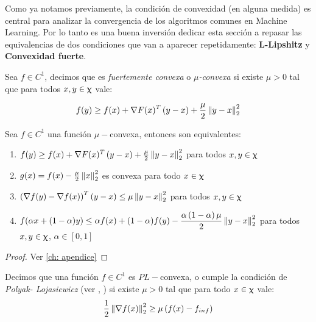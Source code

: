 Como ya notamos previamente, la condici\'on de convexidad (en alguna medida) es central para analizar la convergencia de los algoritmos comunes en Machine Learning. Por lo tanto es una buena inversi\'on dedicar esta secci\'on a repasar las equivalencias de dos condiciones que van a aparecer repetidamente: \textbf{L-Lipshitz} y \textbf{Convexidad fuerte}.

\begin{definition}
	\label{def: Fuertemente convexa}
	Sea $f \in C^1$, decimos que es \textit{fuertemente convexa} o $\mu$\textit{-convexa} si existe $\mu > 0$ tal que para todos $x,y \in \upchi$ vale:
	
	\begin{equation}
		f(y) \geq f(x) + \nabla F(x)^T\left(y-x\right) + \frac{\mu}{2} \left\lVert y-x\right\rVert_2^2
	\end{equation}
\end{definition}

\begin{proposition}
	\label{prop: equivalencias convexidad fuerte}
	Sea $f \in C^1$ una funci\'on $\mu-$convexa, entonces son equivalentes:
	\begin{enumerate}
		\item $f(y) \geq f(x) + \nabla F(x)^T\left(y-x\right) + \frac{\mu}{2} \left\lVert y-x\right\rVert_2^2$ para todos $x,y \in \upchi$
		\item $g(x) = f(x) - \frac{\mu}{2} \left\lVert x\right\rVert_2^2$ es convexa para todo $x \in \upchi$
		\item $\left(\nabla f(y) - \nabla f(x)\right)^T \left(y-x\right) \leq \mu \left\lVert y-x\right\rVert_2^2$ para todos $x,y \in \upchi$
		\item $f(\alpha x + (1-\alpha)y) \leq \alpha f(x) + (1-\alpha) f(y) - \dfrac{\alpha \left(1 - \alpha \right) \mu}{2}\left\lVert y-x\right\rVert_2^2$ para  todos $x,y \in \upchi$, $\alpha \in [0,1]$
	\end{enumerate}
\end{proposition}

\begin{proof}
	Ver \ref{ch: apendice}
\end{proof}

\begin{definition}
	\label{def: Condicion PL}
	Decimos que una funci\'on $f \in C^1$ es $PL-$convexa, o cumple la condici\'on de \textit{Polyak- Lojasiewicz} (ver \cite{polyak:1963}, \cite{lojasiewicz:1963}) si existe $\mu >0$ tal que para todo $x \in \upchi$ vale:
	\begin{equation}
	\frac{1}{2} \left\lVert\nabla f(x)\right\rVert^2_2 \geq \mu \left(f(x) - f_{inf}\right)
	\end{equation}
\end{definition}

